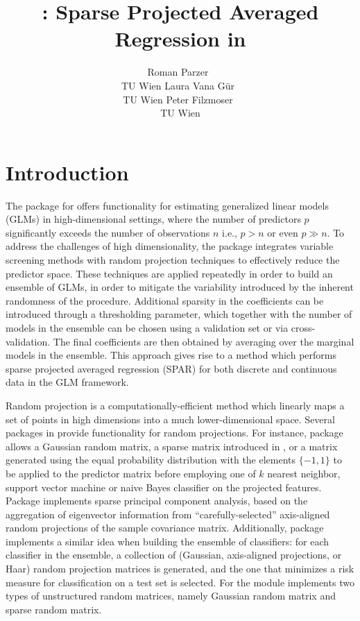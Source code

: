 \documentclass[
  article]{jss}
\author{Roman Parzer~\orcidlink{0000-0003-0893-3190}\\TU Wien \And Laura
Vana Gür~\orcidlink{0000-0002-9613-7604}\\TU Wien \AND Peter
Filzmoser~\orcidlink{0000-0002-8014-4682}\\TU Wien}
\title{\pkg{spar}: Sparse Projected Averaged Regression in \proglang{R}}
\begin{document}
\maketitle


\section{Introduction}\label{sec-intro}

The  package for  \citep{RLanguage} offers
functionality for estimating generalized linear models (GLMs) in
high-dimensional settings, where the number of predictors \(p\)
significantly exceeds the number of observations \(n\) i.e., \(p>n\) or
even \(p\gg n\). To address the challenges of high dimensionality, the
package integrates variable screening methods with random projection
techniques to effectively reduce the predictor space. These techniques
are applied repeatedly in order to build an ensemble of GLMs, in order
to mitigate the variability introduced by the inherent randomness of the
procedure. Additional sparsity in the coefficients can be introduced
through a thresholding parameter, which together with the number of
models in the ensemble can be chosen using a validation set or via
cross-validation. The final coefficients are then obtained by averaging
over the marginal models in the ensemble. This approach gives rise to a
method which performs sparse projected averaged regression (SPAR) for
both discrete and continuous data in the GLM framework.

Random projection is a computationally-efficient method which linearly
maps a set of points in high dimensions into a much lower-dimensional
space. Several packages in  provide functionality for random
projections. For instance, package 
\citep{RandProR, SIDDHARTH2020100629} allows a Gaussian random matrix, a
sparse matrix introduced in
\citet{ACHLIOPTAS2003JL},\citet{LiHastie2006VerySparseRP} or a matrix
generated using the equal probability distribution with the elements
\(\{-1,1\}\) to be applied to the predictor matrix before employing one
of \(k\) nearest neighbor, support vector machine or naive Bayes
classifier on the projected features. Package 
\citep{SPCAvRPR} implements sparse principal component analysis, based
on the aggregation of eigenvector information from
``carefully-selected'' axis-aligned random projections of the sample
covariance matrix. Additionally, package 
\citep{RPEnsembleR} implements a similar idea when building the ensemble
of classifiers: for each classifier in the ensemble, a collection of
(Gaussian, axis-aligned projections, or Haar) random projection matrices
is generated, and the one that minimizes a risk measure for
classification on a test set is selected. For 
\citep{Python} the  module
\citep{pedregosa2011scikit} implements two types of unstructured random
matrices, namely Gaussian random matrix and sparse random matrix.
\end{document}
